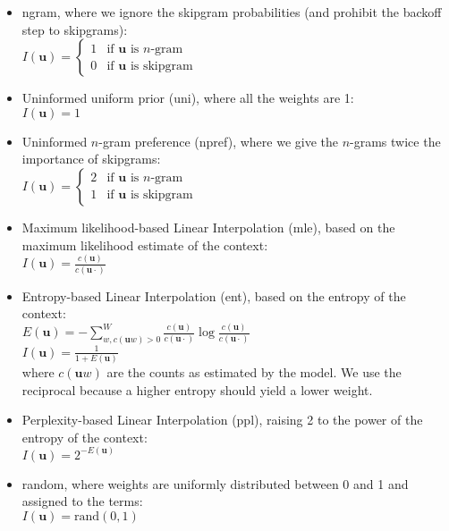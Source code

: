   \begin{itemize}
  \item \textsf{ngram}, where we ignore the skipgram probabilities (and prohibit the backoff step to skipgrams): \\
	$I(\mathbf{u}) =
  \begin{cases}
    1 & \text{if } \mathbf{u} \text{ is }n\text{-gram} \\
    0 & \text{if } \mathbf{u} \text{ is skipgram}
  \end{cases}$
\item \textsf{Uninformed uniform prior (uni)}, where all the weights are 1:\\ 
	$ I(\mathbf{u}) = 1 $
\item \textsf{Uninformed $n$-gram preference (npref)}, where we give the $n$-grams twice the importance of skipgrams: \\
	$I(\mathbf{u}) =
  \begin{cases}
    2 & \text{if } \mathbf{u} \text{ is }n\text{-gram} \\
    1 & \text{if } \mathbf{u} \text{ is skipgram}
  \end{cases}$
  \item \textsf{Maximum likelihood-based Linear Interpolation (mle)}, based on the maximum likelihood estimate of the context: \\[0.5ex]
	$ I(\mathbf{u}) = \displaystyle \frac{c(\mathbf{u})}{c(\mathbf{u}\cdot)} $ \\
\item \textsf{Entropy-based Linear Interpolation (ent)}, based on the entropy of the context: \\
	$E(\mathbf{u}) = -\displaystyle \sum_{w,c(\mathbf{u}w)>0}^W\frac{c(\mathbf{u})}{c(\mathbf{u}\cdot)}\log\frac{c(\mathbf{u})}{c(\mathbf{u}\cdot)} $ \\
    $ I(\mathbf{u}) = \displaystyle \frac{1}{1+E(\mathbf{u})}$ \\
    where $c(\mathbf{u}w)$ are the counts as estimated by the model. We use the reciprocal because a higher entropy should yield a lower weight.
\item \textsf{Perplexity-based Linear Interpolation (ppl)}, raising 2 to the power of the entropy of the context: \\ %
	$\textstyle I(\mathbf{u}) = \displaystyle 2^{-E(\mathbf{u})} $
    \item \textsf{random}, where weights are uniformly distributed between 0 and 1 and assigned to the terms: \\
    $ I(\mathbf{u}) = \text{rand}(0,1) $
  \end{itemize} 

